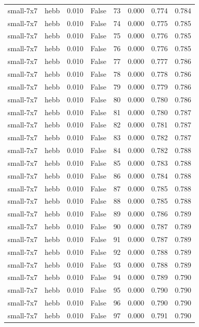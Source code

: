 \begin{tabular}{llrrrrrr}
small-7x7 & hebb & 0.010 & False & 73 & 0.000 & 0.774 & 0.784 \\
small-7x7 & hebb & 0.010 & False & 74 & 0.000 & 0.775 & 0.785 \\
small-7x7 & hebb & 0.010 & False & 75 & 0.000 & 0.776 & 0.785 \\
small-7x7 & hebb & 0.010 & False & 76 & 0.000 & 0.776 & 0.785 \\
small-7x7 & hebb & 0.010 & False & 77 & 0.000 & 0.777 & 0.786 \\
small-7x7 & hebb & 0.010 & False & 78 & 0.000 & 0.778 & 0.786 \\
small-7x7 & hebb & 0.010 & False & 79 & 0.000 & 0.779 & 0.786 \\
small-7x7 & hebb & 0.010 & False & 80 & 0.000 & 0.780 & 0.786 \\
small-7x7 & hebb & 0.010 & False & 81 & 0.000 & 0.780 & 0.787 \\
small-7x7 & hebb & 0.010 & False & 82 & 0.000 & 0.781 & 0.787 \\
small-7x7 & hebb & 0.010 & False & 83 & 0.000 & 0.782 & 0.787 \\
small-7x7 & hebb & 0.010 & False & 84 & 0.000 & 0.782 & 0.788 \\
small-7x7 & hebb & 0.010 & False & 85 & 0.000 & 0.783 & 0.788 \\
small-7x7 & hebb & 0.010 & False & 86 & 0.000 & 0.784 & 0.788 \\
small-7x7 & hebb & 0.010 & False & 87 & 0.000 & 0.785 & 0.788 \\
small-7x7 & hebb & 0.010 & False & 88 & 0.000 & 0.785 & 0.788 \\
small-7x7 & hebb & 0.010 & False & 89 & 0.000 & 0.786 & 0.789 \\
small-7x7 & hebb & 0.010 & False & 90 & 0.000 & 0.787 & 0.789 \\
small-7x7 & hebb & 0.010 & False & 91 & 0.000 & 0.787 & 0.789 \\
small-7x7 & hebb & 0.010 & False & 92 & 0.000 & 0.788 & 0.789 \\
small-7x7 & hebb & 0.010 & False & 93 & 0.000 & 0.788 & 0.789 \\
small-7x7 & hebb & 0.010 & False & 94 & 0.000 & 0.789 & 0.790 \\
small-7x7 & hebb & 0.010 & False & 95 & 0.000 & 0.790 & 0.790 \\
small-7x7 & hebb & 0.010 & False & 96 & 0.000 & 0.790 & 0.790 \\
small-7x7 & hebb & 0.010 & False & 97 & 0.000 & 0.791 & 0.790 \\

\end{tabular}
